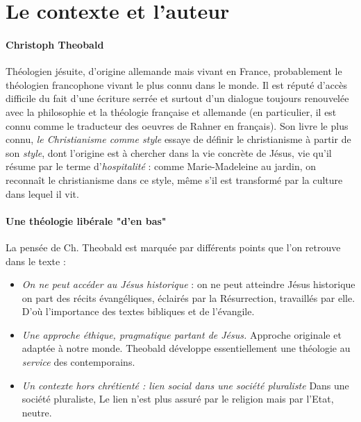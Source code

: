 




\section{ Le contexte et l’auteur}

\paragraph{Christoph Theobald} Théologien jésuite, d'origine allemande mais vivant en France, probablement le théologien francophone vivant le plus connu dans le monde. Il est réputé d'accès difficile du fait d'une écriture serrée et surtout d'un dialogue toujours renouvelée avec la philosophie et la théologie française et allemande (en particulier, il est connu comme le traducteur des oeuvres de Rahner en français).  Son livre le plus connu, \textit{le Christianisme comme style} \cite{theobald_christianisme_2007} essaye de définir le christianisme à partir de son \textit{style}, dont l'origine est à chercher dans la vie concrète de Jésus, vie qu'il résume par le terme d'\textit{hospitalité} : comme Marie-Madeleine au jardin, on reconnaît le christianisme dans ce style, même s'il est transformé par la culture dans lequel il vit.


\paragraph{Une théologie libérale "d'en bas"} La pensée de Ch. Theobald est marquée par différents points que l'on retrouve dans le texte : 
\begin{itemize}
    \item \textit{On ne peut accéder au Jésus historique} : on ne peut atteindre Jésus historique  on part des récits évangéliques, éclairés par la Résurrection, travaillés par elle. D'où l'importance des textes bibliques et de l'évangile.
    \item  \textit{Une approche éthique, pragmatique partant de Jésus.}    Approche originale et adaptée à notre monde. Theobald développe essentiellement une  théologie au \textit{service} des contemporains. 
    \item \textit{Un contexte hors chrétienté : lien social dans une société pluraliste} Dans une société pluraliste,  Le lien n'est plus assuré par le religion mais par l'Etat, neutre.
\end{itemize}
  
